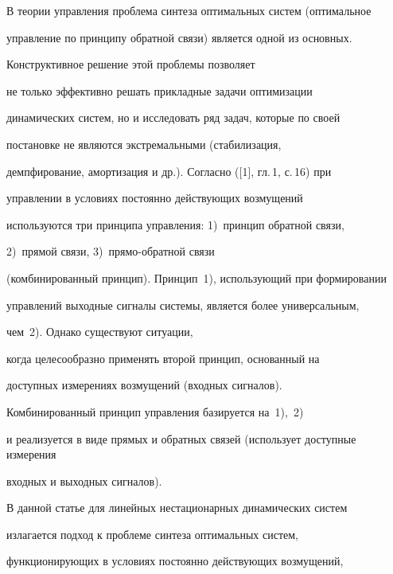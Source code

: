 

\maketitle


\label{begin}








В теории управления проблема синтеза оптимальных систем (оптимальное


управление по принципу обратной связи) является одной из основных.


Конструктивное решение этой проблемы позволяет


не только эффективно решать прикладные задачи оптимизации


динамических систем, но и исследовать ряд задач, которые по своей


постановке не являются экстремальными (стабилизация,


демпфирование, амортизация и др.). Согласно ([1], гл.\,1, с.\,16) при


управлении в условиях постоянно действующих возмущений


используются три принципа управления: 1)~принцип обратной связи,


2)~прямой связи, 3)~прямо-обратной связи


(комбинированный принцип). Принцип~1), использующий при формировании


управлений выходные сигналы системы, является более универсальным,


чем~2). Однако существуют ситуации,


когда целесообразно применять второй принцип, основанный на


доступных измерениях возмущений (входных сигналов).


Комбинированный принцип управления базируется на~1),~2)


и реализуется в виде прямых и обратных связей (использует доступные измерения


входных и выходных сигналов).





В данной статье для линейных нестационарных динамических систем


излагается подход к проблеме синтеза оптимальных систем,


функционирующих в условиях постоянно действующих возмущений,


